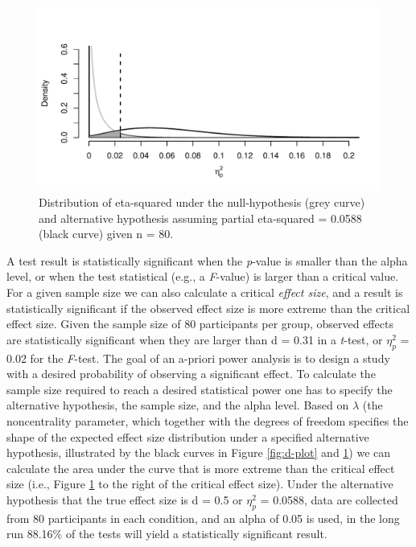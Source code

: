 \documentclass[
  ,jou,floatsintext]{apa6}
\begin{document}
\begin{figure}
\centering
\includegraphics{0.1_Simulation_Based_Power_Analysis_For_Factorial_ANOVA_Designs_files/figure-latex/eta-plot-1.pdf}
\caption{\label{fig:eta-plot}Distribution of eta-squared under the null-hypothesis (grey curve) and alternative hypothesis assuming partial eta-squared = 0.0588 (black curve) given n = 80.}
\end{figure}

A test result is statistically significant when the \emph{p}-value is smaller than the alpha level, or when the test statistical (e.g., a \emph{F}-value) is larger than a critical value.
For a given sample size we can also calculate a critical \emph{effect size}, and a result is statistically significant if the observed effect size is more extreme than the critical effect size.
Given the sample size of 80 participants per group, observed effects are statistically significant when they are larger than d = 0.31 in a \emph{t}-test, or \(\eta_p^2\) = 0.02 for the \emph{F}-test.
The goal of an a-priori power analysis is to design a study with a desired probability of observing a significant effect.
To calculate the sample size required to reach a desired statistical power one has to specify the alternative hypothesis, the sample size, and the alpha level.
Based on \(\lambda\) (the noncentrality parameter, which together with the degrees of freedom specifies the shape of the expected effect size distribution under a specified alternative hypothesis, illustrated by the black curves in Figure \ref{fig:d-plot} and \ref{fig:eta-plot}) we can calculate the area under the curve that is more extreme than the critical effect size (i.e., Figure \ref{fig:eta-plot} to the right of the critical effect size).
Under the alternative hypothesis that the true effect size is d = 0.5 or \(\eta_p^2\) = 0.0588, data are collected from 80 participants in each condition, and an alpha of 0.05 is used, in the long run 88.16\% of the tests will yield a statistically significant result.
\end{document}
